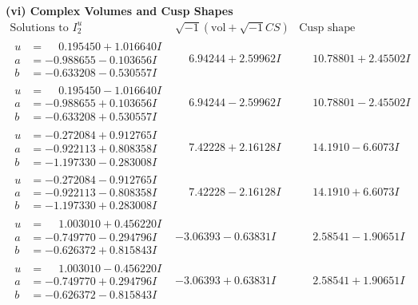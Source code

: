 \documentclass[1p]{elsarticle_modified}
\theoremstyle{definition}
\newcommand{\I}{\sqrt{-1}}
\begin{document}
\newpage\flushleft \textbf{(vi) Complex Volumes and Cusp Shapes}
$$\begin{array}{c|c|c}  
\text{Solutions to }I^u_{2}& \I (\text{vol} + \sqrt{-1}CS) & \text{Cusp shape}\\
 \hline 
\begin{aligned}
u &= \phantom{-}0.195450 + 1.016640 I \\
a &= -0.988655 - 0.103656 I \\
b &= -0.633208 - 0.530557 I\end{aligned}
 & \phantom{-}6.94244 + 2.59962 I & \phantom{-}10.78801 + 2.45502 I \\ \hline\begin{aligned}
u &= \phantom{-}0.195450 - 1.016640 I \\
a &= -0.988655 + 0.103656 I \\
b &= -0.633208 + 0.530557 I\end{aligned}
 & \phantom{-}6.94244 - 2.59962 I & \phantom{-}10.78801 - 2.45502 I \\ \hline\begin{aligned}
u &= -0.272084 + 0.912765 I \\
a &= -0.922113 + 0.808358 I \\
b &= -1.197330 - 0.283008 I\end{aligned}
 & \phantom{-}7.42228 + 2.16128 I & \phantom{-}14.1910 - 6.6073 I \\ \hline\begin{aligned}
u &= -0.272084 - 0.912765 I \\
a &= -0.922113 - 0.808358 I \\
b &= -1.197330 + 0.283008 I\end{aligned}
 & \phantom{-}7.42228 - 2.16128 I & \phantom{-}14.1910 + 6.6073 I \\ \hline\begin{aligned}
u &= \phantom{-}1.003010 + 0.456220 I \\
a &= -0.749770 - 0.294796 I \\
b &= -0.626372 + 0.815843 I\end{aligned}
 & -3.06393 - 0.63831 I & \phantom{-}2.58541 - 1.90651 I \\ \hline\begin{aligned}
u &= \phantom{-}1.003010 - 0.456220 I \\
a &= -0.749770 + 0.294796 I \\
b &= -0.626372 - 0.815843 I\end{aligned}
 & -3.06393 + 0.63831 I & \phantom{-}2.58541 + 1.90651 I \\ \hline\begin{aligned}

\end{aligned}
\end{array}$$
\end{document}
